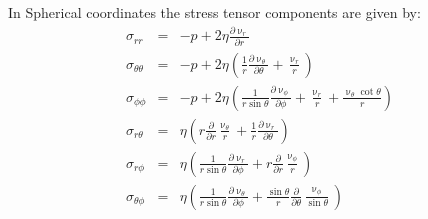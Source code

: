 In Spherical coordinates the stress tensor components are given by:
\begin{eqnarray}
\sigma_{rr} &=& -p + 2 \eta \frac{\partial \upnu_r}{\partial r}      \\
\sigma_{\theta\theta} &=& 
 -p + 2\eta \left( \frac{1}{r} \frac{\partial \upnu_\theta}{\partial\theta} +\frac{\upnu_r}{r} \right)    \\
\sigma_{\phi\phi} &=& 
-p + 2\eta \left( \frac{1}{r \sin \theta} \frac{\partial \upnu_\phi}{\partial \phi} 
+\frac{\upnu_r}{r}  + \frac{\upnu_\theta \cot \theta}{r} \right) \\
\sigma_{r\theta} &=& \eta\left(  r \frac{\partial}{\partial r} \frac{\upnu_\theta}{r}  
+\frac{1}{r} \frac{\partial \upnu_r}{\partial\theta}   \right)\\
\sigma_{r\phi} &=& \eta \left( \frac{1}{r \sin\theta}\frac{\partial \upnu_r}{\partial \phi} 
+ r \frac{\partial}{\partial r} \frac{\upnu_\phi}{r}  \right)\\
\sigma_{\theta \phi} &=& \eta \left(
\frac{1}{r \sin\theta} \frac{\partial \upnu_\theta}{\partial\phi}
+\frac{\sin\theta}{r} \frac{\partial}{\partial \theta} \frac{\upnu_\phi}{\sin\theta}
\right) 
\end{eqnarray}



